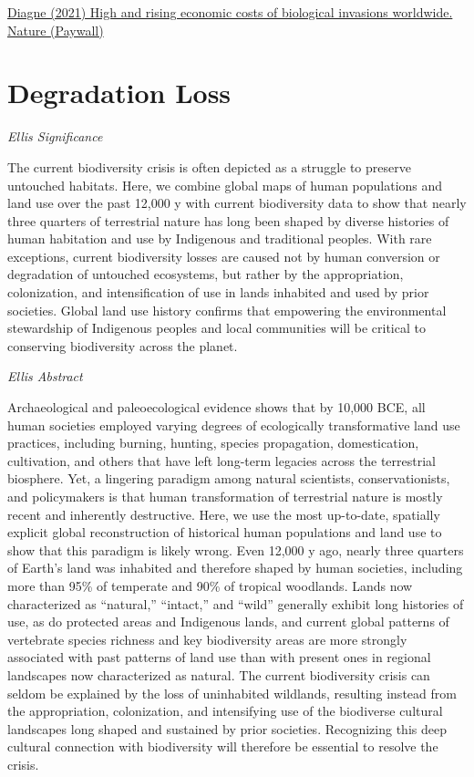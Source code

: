 \documentclass[
]{book}
\begin{document}
\href{https://www.nature.com/articles/s41586-021-03405-6}{Diagne (2021) High and rising economic costs of biological invasions worldwide. Nature (Paywall)}

\hypertarget{degradation-loss}{%
\section{Degradation Loss}\label{degradation-loss}}

\emph{Ellis Significance}

The current biodiversity crisis is often depicted as a struggle to preserve untouched habitats. Here, we combine global maps of human populations and land use over the past 12,000 y with current biodiversity data to show that nearly three quarters of terrestrial nature has long been shaped by diverse histories of human habitation and use by Indigenous and traditional peoples. With rare exceptions, current biodiversity losses are caused not by human conversion or degradation of untouched ecosystems, but rather by the appropriation, colonization, and intensification of use in lands inhabited and used by prior societies. Global land use history confirms that empowering the environmental stewardship of Indigenous peoples and local communities will be critical to conserving biodiversity across the planet.

\emph{Ellis Abstract}

Archaeological and paleoecological evidence shows that by 10,000 BCE, all human societies employed varying degrees of ecologically transformative land use practices, including burning, hunting, species propagation, domestication, cultivation, and others that have left long-term legacies across the terrestrial biosphere. Yet, a lingering paradigm among natural scientists, conservationists, and policymakers is that human transformation of terrestrial nature is mostly recent and inherently destructive. Here, we use the most up-to-date, spatially explicit global reconstruction of historical human populations and land use to show that this paradigm is likely wrong. Even 12,000 y ago, nearly three quarters of Earth's land was inhabited and therefore shaped by human societies, including more than 95\% of temperate and 90\% of tropical woodlands. Lands now characterized as ``natural,'' ``intact,'' and ``wild'' generally exhibit long histories of use, as do protected areas and Indigenous lands, and current global patterns of vertebrate species richness and key biodiversity areas are more strongly associated with past patterns of land use than with present ones in regional landscapes now characterized as natural. The current biodiversity crisis can seldom be explained by the loss of uninhabited wildlands, resulting instead from the appropriation, colonization, and intensifying use of the biodiverse cultural landscapes long shaped and sustained by prior societies. Recognizing this deep cultural connection with biodiversity will therefore be essential to resolve the crisis.
\end{document}
